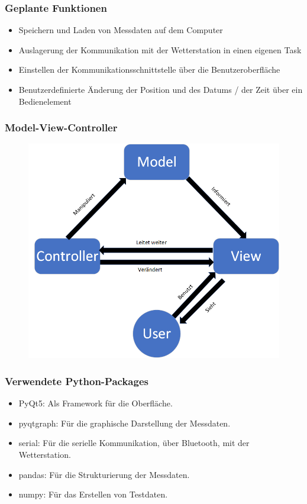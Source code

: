 \documentclass{beamer}
\begin{document}
\begin{frame}
  \frametitle{Geplante Funktionen}
  \begin{itemize}
  \item Speichern und Laden von Messdaten auf dem Computer
  \item Auslagerung der Kommunikation mit der Wetterstation in einen eigenen Task
  \item Einstellen der Kommunikationsschnittstelle über die Benutzeroberfläche
  \item Benutzerdefinierte Änderung der Position und des Datums / der Zeit über ein Bedienelement
  \end{itemize}
\end{frame}
\begin{frame}
  \frametitle{Model-View-Controller}
  \begin{figure}[H]
    \centering \includegraphics[width=.7\textwidth]{./img/MVC.png}
  \end{figure}
\end{frame}

\begin{frame}
  \frametitle{Verwendete Python-Packages}
  \begin{itemize}
  \item PyQt5: Als Framework für die Oberfläche.
  \item pyqtgraph: Für die graphische Darstellung der Messdaten.
  \item serial: Für die serielle Kommunikation, über Bluetooth, mit
    der Wetterstation.
  \item pandas: Für die Strukturierung der Messdaten.
  \item numpy: Für das Erstellen von Testdaten.
  \end{itemize}

\end{frame}
\end{document}
